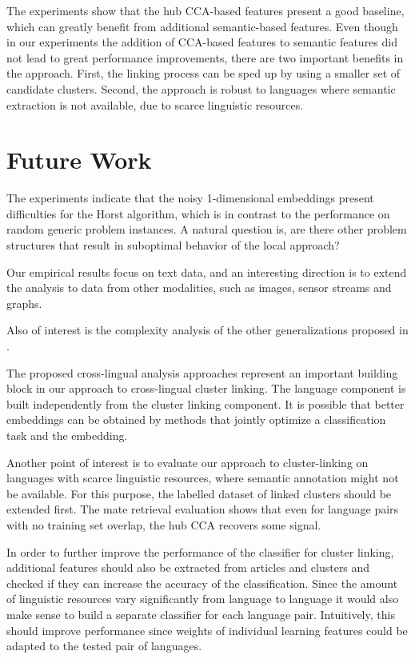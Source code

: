 The experiments show that the hub CCA-based features present a good baseline, 
which can greatly benefit from additional semantic-based features. Even though 
in our experiments the addition of CCA-based features to semantic features did not 
lead to great performance improvements, there are two important benefits in the 
approach. First, the linking process can be sped up by using a smaller set of
candidate clusters. Second, the approach is robust to languages where semantic 
extraction is not available, due to scarce linguistic resources.

\section{Future Work}

The experiments indicate that the noisy 1-dimensional embeddings present difficulties for the Horst
algorithm, which is in contrast to the performance on random generic problem instances. A natural
question is, are there other problem structures that result in suboptimal behavior of the local approach? 

Our empirical results focus on text data, and an interesting direction is to extend the analysis to 
data from other modalities, such as images, sensor streams and graphs.

Also of interest is the complexity analysis of the other generalizations proposed in \cite{Kettenring}.

The proposed cross-lingual analysis approaches represent an important building block in our
approach to cross-lingual cluster linking. The language component is 
built independently from the cluster linking component. 
It is possible that better embeddings can be obtained by methods that
jointly optimize a classification task and the embedding.

Another point of interest is to evaluate our approach to cluster-linking on languages with scarce 
linguistic resources, where semantic annotation might not be available. For this purpose, 
the labelled dataset of linked clusters should be extended first. The mate retrieval evaluation 
shows that even for language pairs with no training set overlap, the hub CCA recovers some signal.

In order to further improve the performance of the classifier for cluster linking, additional features should also
be extracted from articles and clusters and checked if they can increase the accuracy of the classification.
Since the amount of linguistic resources vary significantly from language to language it would also make sense
to build a separate classifier for each language pair. Intuitively, this should improve performance since weights
of individual learning features could be adapted to the tested pair of languages.
